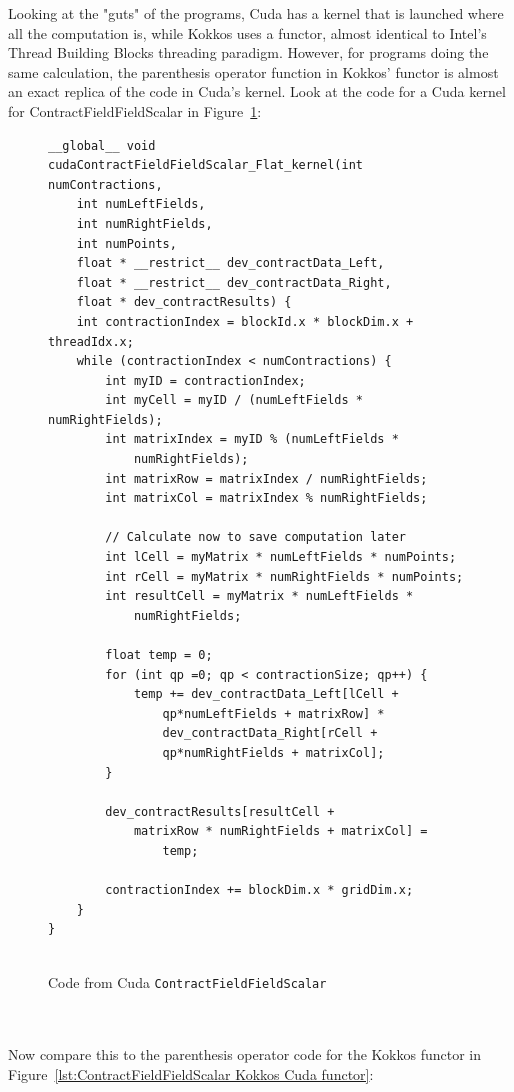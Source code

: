 Looking at the "guts" of the programs, Cuda has a kernel that is launched where
all the computation is, while Kokkos uses a functor, almost identical to
Intel's Thread Building Blocks threading paradigm. However, for programs doing
the same calculation, the parenthesis operator function in Kokkos' functor is
almost an exact replica of the code in Cuda's kernel. Look at the code for a Cuda kernel
for ContractFieldFieldScalar in Figure~\ref{lst:ContractFieldFieldScalar Cuda kernel}: \\
\begin{figure}[htb]
	\begin{lstlisting}
__global__ void
cudaContractFieldFieldScalar_Flat_kernel(int numContractions,
	int numLeftFields,
	int numRightFields,
	int numPoints,
	float * __restrict__ dev_contractData_Left,
	float * __restrict__ dev_contractData_Right,
	float * dev_contractResults) {
	int contractionIndex = blockId.x * blockDim.x + threadIdx.x;
	while (contractionIndex < numContractions) {
		int myID = contractionIndex;
		int myCell = myID / (numLeftFields * numRightFields);
		int matrixIndex = myID % (numLeftFields * 
			numRightFields);
		int matrixRow = matrixIndex / numRightFields;
		int matrixCol = matrixIndex % numRightFields;
		
		// Calculate now to save computation later
		int lCell = myMatrix * numLeftFields * numPoints;
		int rCell = myMatrix * numRightFields * numPoints;
		int resultCell = myMatrix * numLeftFields * 
			numRightFields;
		
		float temp = 0;
		for (int qp =0; qp < contractionSize; qp++) {
			temp += dev_contractData_Left[lCell + 
				qp*numLeftFields + matrixRow] *
				dev_contractData_Right[rCell + 
				qp*numRightFields + matrixCol];
		}

		dev_contractResults[resultCell + 
			matrixRow * numRightFields + matrixCol] = 
				temp;
		
		contractionIndex += blockDim.x * gridDim.x;
	}
}
	
	\end{lstlisting}
\caption{Code from Cuda \texttt{ContractFieldFieldScalar}
\label{lst:ContractFieldFieldScalar Cuda kernel}}
\end{figure} \\
\\
Now compare this to the parenthesis operator code for the Kokkos functor in
Figure~\ref{lst:ContractFieldFieldScalar Kokkos Cuda functor}: \\
